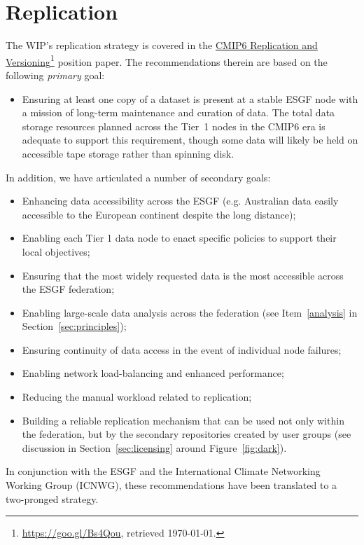 \documentclass[gmd,manuscript]{copernicus}
\newcommand{\urlref}[2] {\href{#1}{#2}\footnote{\url{#1}, retrieved \today.}}
\begin{document}
\section{Replication}
\label{sec:replica}

The WIP's replication strategy is covered in the
\urlref{https://goo.gl/Bs4Qou}{CMIP6 Replication and Versioning}
position paper. The recommendations therein are based on the following
\emph{primary} goal:

\begin{itemize}
\item Ensuring at least one copy of a dataset is present at a stable
ESGF node with a mission of long-term maintenance and curation of
data. The total data storage resources planned across
  the Tier~1 nodes in the CMIP6 era is adequate to support this
  requirement, though some data will likely be held on accessible tape
  storage rather than spinning disk.
\end{itemize}

In addition, we have articulated a number of secondary goals:

\begin{itemize}
\item Enhancing data accessibility across the ESGF (e.g. Australian
  data easily accessible to the European continent despite the long
  distance);
\item Enabling each Tier 1 data node to enact specific policies to support their
  local objectives;
\item Ensuring that the most widely requested data is the most
  accessible across the ESGF federation;
\item Enabling large-scale data analysis across the federation (see
  Item~\ref{analysis} in Section~\ref{sec:principles});
\item Ensuring continuity of data access in the event of individual node
  failures;
\item Enabling network load-balancing and enhanced performance;
\item Reducing the manual workload related to replication;
\item Building a reliable replication mechanism that can be used not
  only within the federation, but by the secondary repositories
  created by user groups (see discussion in Section~\ref{sec:licensing} around
  Figure~\ref{fig:dark}).
\end{itemize}

In conjunction with the ESGF and the International Climate Networking
Working Group (ICNWG), these recommendations have been translated to a
two-pronged strategy.
\end{document}
